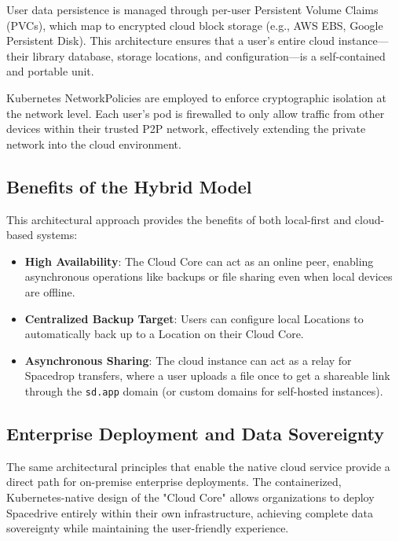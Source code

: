 \documentclass[sigconf]{acmart}
\begin{document}
User data persistence is managed through per-user Persistent Volume Claims (PVCs), which map to encrypted cloud block storage (e.g., AWS EBS, Google Persistent Disk). This architecture ensures that a user's entire cloud instance---their library database, storage locations, and configuration---is a self-contained and portable unit.

Kubernetes NetworkPolicies are employed to enforce cryptographic isolation at the network level. Each user's pod is firewalled to only allow traffic from other devices within their trusted P2P network, effectively extending the private network into the cloud environment.

\subsection{Benefits of the Hybrid Model}
This architectural approach provides the benefits of both local-first and cloud-based systems:
\begin{itemize}[noitemsep, topsep=0pt]
    \item \textbf{High Availability}: The Cloud Core can act as an online peer, enabling asynchronous operations like backups or file sharing even when local devices are offline.
    \item \textbf{Centralized Backup Target}: Users can configure local Locations to automatically back up to a Location on their Cloud Core.
    \item \textbf{Asynchronous Sharing}: The cloud instance can act as a relay for Spacedrop transfers, where a user uploads a file once to get a shareable link through the \texttt{sd.app} domain (or custom domains for self-hosted instances).
\end{itemize}

\subsection{Enterprise Deployment and Data Sovereignty}
The same architectural principles that enable the native cloud service provide a direct path for on-premise enterprise deployments. The containerized, Kubernetes-native design of the "Cloud Core" allows organizations to deploy Spacedrive entirely within their own infrastructure, achieving complete data sovereignty while maintaining the user-friendly experience.
\end{document}
